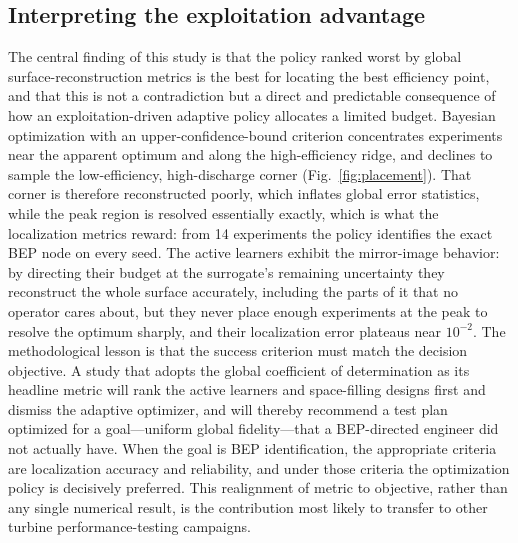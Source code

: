 \documentclass[preprint,12pt]{elsarticle}
\begin{document}
\subsection{Interpreting the exploitation advantage}
The central finding of this study is that the policy ranked worst by global
surface-reconstruction metrics is the best for locating the best efficiency point, and
that this is not a contradiction but a direct and predictable consequence of how an
exploitation-driven adaptive policy allocates a limited budget. Bayesian optimization
with an upper-confidence-bound criterion concentrates experiments near the apparent
optimum and along the high-efficiency ridge, and declines to sample the
low-efficiency, high-discharge corner (Fig.~\ref{fig:placement}). That corner is
therefore reconstructed poorly, which inflates global error statistics, while the peak
region is resolved essentially exactly, which is what the localization metrics reward:
from 14 experiments the policy identifies the exact BEP node on every seed. The active
learners exhibit the mirror-image behavior: by directing their budget at the
surrogate's remaining uncertainty they reconstruct the whole surface accurately,
including the parts of it that no operator cares about, but they never place enough
experiments at the peak to resolve the optimum sharply, and their localization error
plateaus near $10^{-2}$. The methodological lesson is that the success criterion must
match the decision objective. A study that adopts the global coefficient of
determination as its headline metric will rank the active learners and space-filling
designs first and dismiss the adaptive optimizer, and will thereby recommend a test
plan optimized for a goal---uniform global fidelity---that a BEP-directed engineer did
not actually have. When the goal is BEP identification, the appropriate criteria are
localization accuracy and reliability, and under those criteria the optimization policy
is decisively preferred. This realignment of metric to objective, rather than any
single numerical result, is the contribution most likely to transfer to other turbine
performance-testing campaigns.
\end{document}
